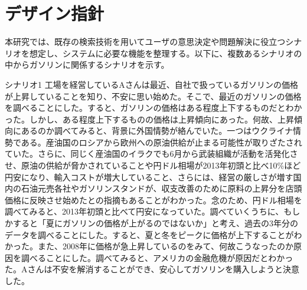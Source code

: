 \documentclass{matsushita-zemi}
\begin{document}
\section{デザイン指針}
本研究では、既存の検索技術を用いてユーザの意思決定や問題解決に役立つシナリオを想定し、システムに必要な機能を整理する。以下に、複数あるシナリオの中からガソリンに関係するシナリオを示す。
\begin{itembox}[l]{シナリオ1}
工場を経営しているAさんは最近、自社で扱っているガソリンの価格が上昇していることを知り、不安に思い始めた。そこで、最近のガソリンの価格を調べることにした。すると、ガソリンの価格はある程度上下するものだとわかった。しかし、ある程度上下するものの価格は上昇傾向にあった。何故、上昇傾向にあるのか調べてみると、背景に外国情勢が絡んでいた。一つはウクライナ情勢である。産油国のロシアから欧州への原油供給が止まる可能性が取りざたされていた。さらに、同じく産油国のイラクでも6月から武装組織が活動を活発化させ、原油の供給が脅かされていることや円ドル相場が2013年初頭と比べ10\%ほど円安になり、輸入コストが増大していること、さらには、経営の厳しさが増す国内の石油元売各社やガソリンスタンドが、収支改善のために原料の上昇分を店頭価格に反映させ始めたとの指摘もあることがわかった。念のため、円ドル相場を調べてみると、2013年初頭と比べて円安になっていた。調べていくうちに、もしかすると「夏にガソリンの価格が上がるのではないか」と考え、過去の3年分のデータを調べることにした。すると、夏と冬をピークに価格が上下することがわかった。また、2008年に価格が急上昇しているのをみて、何故こうなったのか原因を調べることにした。調べてみると、アメリカの金融危機が原因だとわかった。Aさんは不安を解消することができ、安心してガソリンを購入しようと決意した。
\end{itembox}
\end{document}

